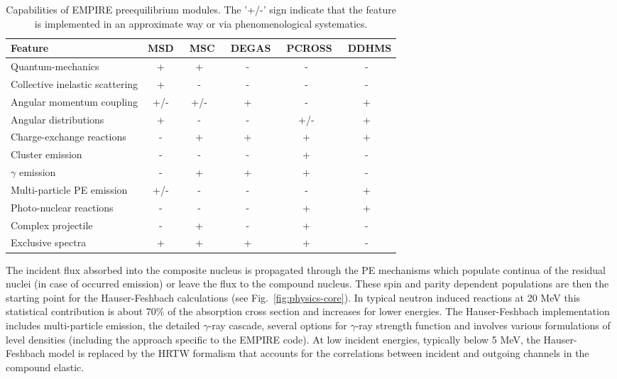 \begin{table*}[tbp]
\caption{Capabilities of EMPIRE preequilibrium modules. The '+/-' sign
indicate that the feature is implemented in an approximate way or via
phenomenological systematics.}
\label{tbl:PEcapabilities}%
\begin{tabular}{lccccc}
\hline
\textbf{Feature} & \textbf{MSD } & \textbf{\ MSC } & \textbf{\ DEGAS } &
\textbf{\ PCROSS } & \textbf{\ DDHMS } \\ \hline
Quantum-mechanics & + & + & - & - & - \\
Collective inelastic scattering & + & - & - & - & - \\
Angular momentum coupling & +/- & +/- & + & - & + \\
Angular distributions & + & - & - & +/- & + \\
Charge-exchange reactions & - & + & + & + & + \\
Cluster emission & - & - & - & + & - \\
$\gamma$ emission & - & + & + & + & - \\
Multi-particle PE emission & +/- & - & - & - & + \\
Photo-nuclear reactions & - & - & - & + & + \\
Complex projectile & - & + & - & + & - \\
Exclusive spectra & + & + & + & + & - \\ \hline
\end{tabular}%
\end{table*}

The incident flux absorbed into the composite nucleus is propagated through
the PE mechanisms which populate continua of the residual nuclei (in case of
occurred emission) or leave the flux to the compound nucleus. These spin and
parity dependent populations are then the starting point for the
Hauser-Feshbach calculations (see Fig.~\ref{fig:physics-core}). In typical
neutron induced reactions at 20 MeV this statistical contribution is about
70\% of the absorption cross section and increases for lower energies. The
Hauser-Feshbach implementation includes multi-particle emission, the
detailed $\gamma $-ray cascade, several options for $\gamma $-ray strength
function and involves various formulations of level densities (including the
approach specific to the EMPIRE code). At low incident energies, typically
below 5 MeV, the Hauser-Feshbach model is replaced by the HRTW formalism
that accounts for the correlations between incident and outgoing channels in
the compound elastic.

